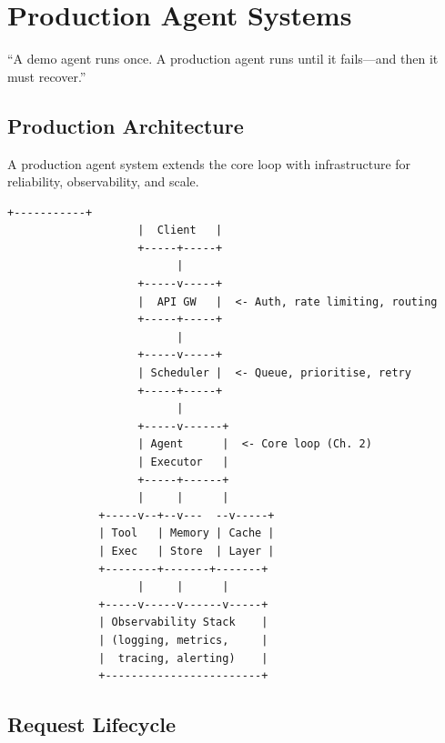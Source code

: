 \chapter{Production Agent Systems}
\label{ch:production}

\epigraph{``A demo agent runs once. A production agent runs until it fails---and then it must recover.''}{}


\section{Production Architecture}

A production agent system extends the core loop with infrastructure for reliability, observability, and scale.

\begin{lstlisting}[caption=Production agent architecture]
                    +-----------+
                    |  Client   |
                    +-----+-----+
                          |
                    +-----v-----+
                    |  API GW   |  <- Auth, rate limiting, routing
                    +-----+-----+
                          |
                    +-----v-----+
                    | Scheduler |  <- Queue, prioritise, retry
                    +-----+-----+
                          |
                    +-----v------+
                    | Agent      |  <- Core loop (Ch. 2)
                    | Executor   |
                    +-----+------+
                    |     |      |
              +-----v--+--v---  --v-----+
              | Tool   | Memory | Cache |
              | Exec   | Store  | Layer |
              +--------+-------+-------+
                    |     |      |
              +-----v-----v------v-----+
              | Observability Stack    |
              | (logging, metrics,     |
              |  tracing, alerting)    |
              +------------------------+
\end{lstlisting}

\section{Request Lifecycle}


